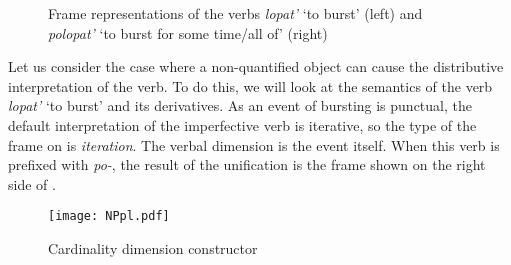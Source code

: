  \begin{figure}
\hfill{}
\hfill%
\hfill%
\caption{Frame representations of the verbs \textit{lopat'} `to burst' (left) and \textit{polopat'} `to burst for some time/all of' (right) \label{frame:lopat}}
\end{figure}
 
Let us consider the case where a non-quantified object can cause the distributive interpretation of the verb. To do this, we will look at the semantics of the verb \textit{lopat'} `to burst' and its derivatives. As an event of bursting is punctual, the default interpretation of the imperfective verb is iterative, so the type of the frame on  is \textit{iteration}. The verbal dimension is the event itself. When this verb is prefixed with \textit{po-}, the result of the unification is the frame shown on the right side of .

\begin{figure}
\small
\hfill%
\begin{minipage}[c]{0.4\textwidth}
\texttt{[image: NPpl.pdf]}
\end{minipage}
\caption{Cardinality dimension constructor\label{constructor:cardinality}}
\end{figure}

